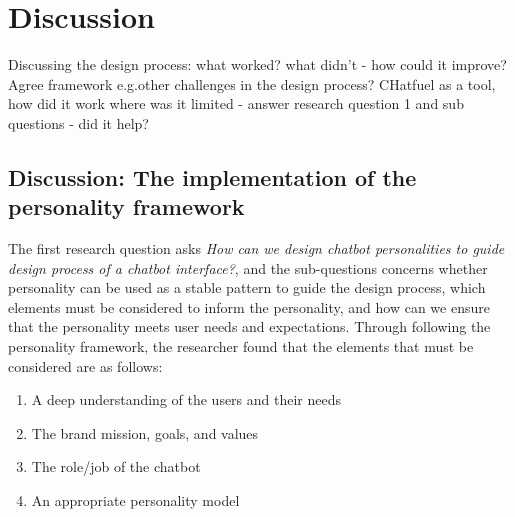 \chapter{Discussion}
\label{chap:discussion}

Discussing the design process: what worked? what didn't - how could it improve? Agree framework e.g.other challenges in the design process? CHatfuel as a tool, how did it work where was it limited - answer research question 1 and sub questions - did it help?

\section{Discussion: The implementation of the personality framework}

The first research question asks \textit{How can we design chatbot personalities to guide design process of a chatbot interface?}, and the sub-questions concerns whether personality can be used as a stable pattern to guide the design process, which elements must be considered to inform the personality, and how can we ensure that the personality meets user needs and expectations. Through following the personality framework, the researcher found that the elements that must be considered are as follows:

\begin{enumerate}
    \item A deep understanding of the users and their needs
    \item The brand mission, goals, and values
    \item The role/job of the chatbot
    \item An appropriate personality model
\end{enumerate}

